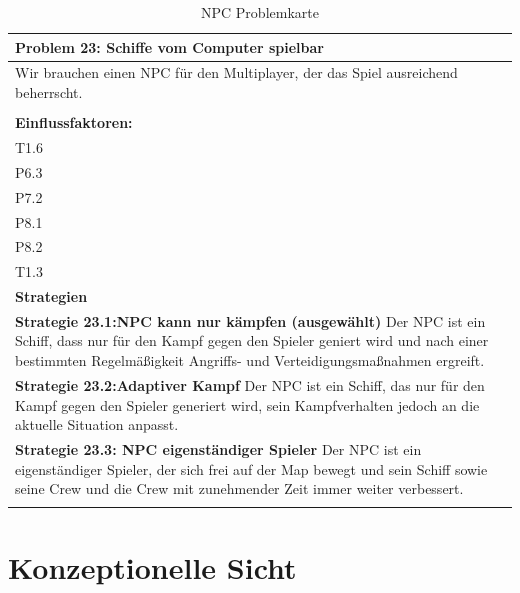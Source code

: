 \documentclass[fontsize=12pt,paper=a4,twoside]{scrartcl}
\begin{document}
\begin{table}[H]
    \centering
    \begin{tabular}{|p{15cm}|}
    \hline
          \textbf{Problem 23: Schiffe vom Computer spielbar}  \\ \hline
	Wir brauchen einen NPC für den Multiplayer, der das Spiel ausreichend beherrscht. \\
         \\ \hline
          \textbf{Einflussfaktoren: } \\
	T1.6 \\
	P6.3 \\
	P7.2 \\
	P8.1 \\
	P8.2 \\
	T1.3 \\
          \hline
          \textbf{Strategien} \\ \hline
            {}          
           \label{strategie:23.1}     
          \textbf{Strategie 23.1:NPC kann nur kämpfen (ausgewählt)} Der NPC ist ein Schiff, dass nur für den Kampf gegen den Spieler geniert wird und nach einer bestimmten Regelmäßigkeit Angriffs- und Verteidigungsmaßnahmen ergreift.  \\        
  {}          
           \label{strategie:23.2}              
          \textbf{Strategie 23.2:Adaptiver Kampf} Der NPC ist ein Schiff, das nur für den Kampf gegen den Spieler generiert wird, sein Kampfverhalten jedoch an die aktuelle Situation anpasst.   \\
	 {}          
           \label{strategie:23.3}     
          \textbf{Strategie 23.3: NPC eigenständiger Spieler} Der NPC ist ein eigenständiger Spieler, der sich frei auf der Map bewegt und sein Schiff sowie seine Crew und die Crew mit zunehmender Zeit immer weiter verbessert. \\ 
	 \\ \hline
    \end{tabular}

    \caption{NPC Problemkarte}
    \label{tab:ProblemKarte23}
\end{table}



\section{Konzeptionelle Sicht} \label{sec:konzeptionell}
\end{document}

